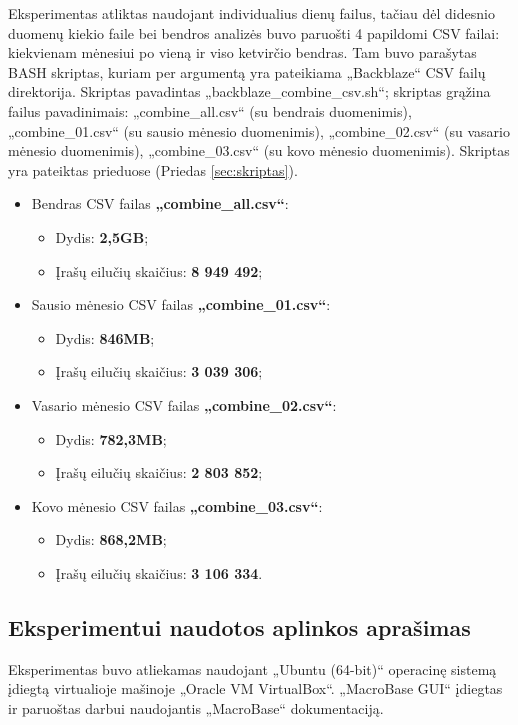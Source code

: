 \documentclass{VUMIFPSkursinis}
\begin{document}
 \label{subsubsubsec:duomenų_paruošimas}
Eksperimentas atliktas naudojant individualius dienų failus, tačiau dėl didesnio duomenų kiekio faile bei bendros analizės buvo paruošti 4 papildomi CSV failai: kiekvienam mėnesiui po vieną ir viso ketvirčio bendras. Tam buvo parašytas BASH skriptas, kuriam per argumentą yra pateikiama „Backblaze“ CSV failų direktorija. Skriptas pavadintas „backblaze\_combine\_csv.sh“; skriptas grąžina failus pavadinimais: „combine\_all.csv“ (su bendrais duomenimis), „combine\_01.csv“ (su sausio mėnesio duomenimis), „combine\_02.csv“ (su vasario mėnesio duomenimis), „combine\_03.csv“ (su kovo mėnesio duomenimis). Skriptas yra pateiktas prieduose (Priedas \ref{sec:skriptas}).
\begin{itemize}
\item Bendras CSV failas \textbf{„combine\_all.csv“}:
\begin{itemize}
\item Dydis: \textbf{2,5GB};
\item Įrašų eilučių skaičius: \textbf{8 949 492};
\end{itemize}

\item Sausio mėnesio CSV failas \textbf{„combine\_01.csv“}:
\begin{itemize}
\item Dydis: \textbf{846MB};
\item Įrašų eilučių skaičius: \textbf{3 039 306};
\end{itemize}

\item Vasario mėnesio CSV failas \textbf{„combine\_02.csv“}:
\begin{itemize}
\item Dydis: \textbf{782,3MB};
\item Įrašų eilučių skaičius: \textbf{2 803 852};
\end{itemize}

\item Kovo mėnesio CSV failas \textbf{„combine\_03.csv“}:
\begin{itemize}
\item Dydis: \textbf{868,2MB};
\item Įrašų eilučių skaičius: \textbf{3 106 334}.
\end{itemize}
\end{itemize}

\subsection{Eksperimentui naudotos aplinkos aprašimas}
Eksperimentas buvo atliekamas naudojant „Ubuntu (64-bit)“ operacinę sistemą įdiegtą virtualioje mašinoje „Oracle VM VirtualBox“. „MacroBase GUI“ įdiegtas ir paruoštas darbui naudojantis „MacroBase“ dokumentaciją.
\end{document}
